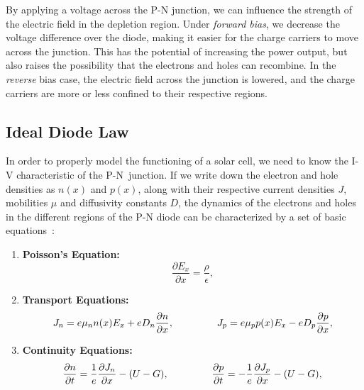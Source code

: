 \begin{refsection}
By applying a voltage across the P-N junction, we can influence the strength 
of the electric field in the depletion region. Under \textit{forward bias}, we 
decrease the voltage difference over the diode, making it easier for the 
charge carriers to move across the junction. This has the potential of 
increasing the power output, but also raises the possibility that the 
electrons and holes can recombine. In the \textit{reverse} bias case, the 
electric field across the junction is lowered, and the charge carriers are 
more or less confined to their respective regions.  
 
\subsection{Ideal Diode Law} 
 
In order to properly model the functioning of a solar cell, we need to know 
the I-V characteristic of the P-N~junction. If we write down the electron and 
hole densities as $n(x)$ and $p(x)$, along with their respective current 
densities $J$, mobilities $\mu$ and diffusivity constants $D$, the dynamics of 
the electrons and holes in the different regions of the P-N diode can be 
characterized by a set of basic equations~\cite{Shockley1949}: 
\vspace{0.1in} 
\begin{enumerate} 

\item \textbf{Poisson's Equation: } \begin{equation}\frac{\partial 
E_x}{\partial x} = \frac{\rho}{\epsilon},\end{equation} 
 
\item \textbf{Transport Equations: } \begin{equation}J_n = e \mu_n n(x) E_x + 
e D_n\frac{\partial n }{\partial x}, \hspace{0.6in} J_p = e \mu_p p(x) E_x - e 
D_p \frac{\partial p}{\partial x},\end{equation} 
 
\item \textbf{Continuity Equations: } \begin{equation}\frac{\partial 
n}{\partial t} = \frac{1}{e} \frac{\partial J_n}{\partial x} - (U - G), 
\hspace{0.6in} \frac{\partial p}{\partial t} = - \frac{1}{e} \frac{\partial 
J_p}{\partial x} - (U - G),\end{equation} 


\end{enumerate}
\end{refsection}
